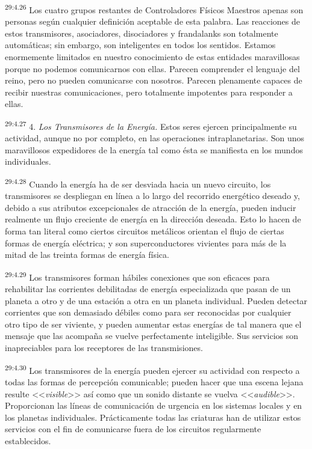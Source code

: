\par
\textsuperscript{29:4.26} Los cuatro grupos restantes de Controladores Físicos Maestros apenas son personas según cualquier definición aceptable de esta palabra. Las reacciones de estos transmisores, asociadores, disociadores y frandalanks son totalmente automáticas; sin embargo, son inteligentes en todos los sentidos. Estamos enormemente limitados en nuestro conocimiento de estas entidades maravillosas porque no podemos comunicarnos con ellas. Parecen comprender el lenguaje del reino, pero no pueden comunicarse con nosotros. Parecen plenamente capaces de recibir nuestras comunicaciones, pero totalmente impotentes para responder a ellas.

\par
\textsuperscript{29:4.27} 4. \textit{Los Transmisores de la Energía.} Estos seres ejercen principalmente su actividad, aunque no por completo, en las operaciones intraplanetarias. Son unos maravillosos expedidores de la energía tal como ésta se manifiesta en los mundos individuales.

\par
\textsuperscript{29:4.28} Cuando la energía ha de ser desviada hacia un nuevo circuito, los transmisores se despliegan en línea a lo largo del recorrido energético deseado y, debido a sus atributos excepcionales de atracción de la energía, pueden inducir realmente un flujo creciente de energía en la dirección deseada. Esto lo hacen de forma tan literal como ciertos circuitos metálicos orientan el flujo de ciertas formas de energía eléctrica; y son superconductores vivientes para más de la mitad de las treinta formas de energía física.

\par
\textsuperscript{29:4.29} Los transmisores forman hábiles conexiones que son eficaces para rehabilitar las corrientes debilitadas de energía especializada que pasan de un planeta a otro y de una estación a otra en un planeta individual. Pueden detectar corrientes que son demasiado débiles como para ser reconocidas por cualquier otro tipo de ser viviente, y pueden aumentar estas energías de tal manera que el mensaje que las acompaña se vuelve perfectamente inteligible. Sus servicios son inapreciables para los receptores de las transmisiones.

\par
\textsuperscript{29:4.30} Los transmisores de la energía pueden ejercer su actividad con respecto a todas las formas de percepción comunicable; pueden hacer que una escena lejana resulte <<\textit{visible}>> así como que un sonido distante se vuelva <<\textit{audible}>>. Proporcionan las líneas de comunicación de urgencia en los sistemas locales y en los planetas individuales. Prácticamente todas las criaturas han de utilizar estos servicios con el fin de comunicarse fuera de los circuitos regularmente establecidos.

